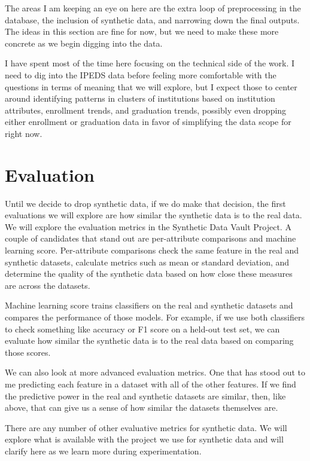 \documentclass[sigconf, authorversion, nonacm]{acmart}
\begin{document}
    The areas I am keeping an eye on here are the extra loop of preprocessing in the database, the inclusion of synthetic data, and narrowing down the final outputs. The ideas in this section are fine for now, but we need to make these more concrete as we begin digging into the data.

    I have spent most of the time here focusing on the technical side of the work. I need to dig into the IPEDS data before feeling more comfortable with the questions in terms of meaning that we will explore, but I expect those to center around identifying patterns in clusters of institutions based on institution attributes, enrollment trends, and graduation trends, possibly even dropping either enrollment or graduation data in favor of simplifying the data scope for right now.

\section{Evaluation}
    Until we decide to drop synthetic data, if we do make that decision, the first evaluations we will explore are how similar the synthetic data is to the real data. We will explore the evaluation metrics in the Synthetic Data Vault Project. A couple of candidates that stand out are per-attribute comparisons and machine learning score. Per-attribute comparisons check the same feature in the real and synthetic datasets, calculate metrics such as mean or standard deviation, and determine the quality of the synthetic data based on how close these measures are across the datasets.

    Machine learning score trains classifiers on the real and synthetic datasets and compares the performance of those models. For example, if we use both classifiers to check something like accuracy or F1 score on a held-out test set, we can evaluate how similar the synthetic data is to the real data based on comparing those scores.

    We can also look at more advanced evaluation metrics. One that has stood out to me predicting each feature in a dataset with all of the other features. If we find the predictive power in the real and synthetic datasets are similar, then, like above, that can give us a sense of how similar the datasets themselves are.

    There are any number of other evaluative metrics for synthetic data. We will explore what is available with the project we use for synthetic data and will clarify here as we learn more during experimentation.
\end{document}
